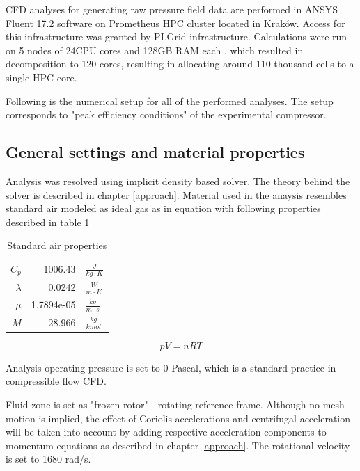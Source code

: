 CFD analyses for generating raw pressure field data are performed in ANSYS Fluent 17.2 software on Prometheus HPC cluster located in Kraków. Access for this infrastructure was granted by PLGrid infrastructure. Calculations were run on 5 nodes of 24CPU cores and 128GB RAM each \citep{prometheus}, which resulted in decomposition to 120 cores, resulting in allocating around 110 thousand cells to a single HPC core.

Following is the numerical setup for all of the performed analyses. The setup corresponds to "peak efficiency conditions" of the experimental compressor.

\subsection{General settings and material properties} \label{casegen}

Analysis was resolved using implicit density based solver. The theory behind the solver is described in chapter \ref{approach}. Material used in the anaysis resembles standard air modeled as ideal gas as in equation with following properties described in table \ref{tab:stdair} 

\begin{table}[htb!]
\centering
\caption{Standard air properties} \label{tab:stdair}
\begin{tabular}{ r r l }
$C_p$ & 1006.43 & $\frac{J}{kg \cdot K}$ \\
$\lambda$ & 0.0242 & $\frac{W}{m \cdot K}$ \\
$\mu$ & 1.7894e-05 & $\frac{kg}{m \cdot s}$ \\
$M$ & 28.966 & $\frac{kg}{kmol}$ \\
\end{tabular}
\end{table}

\begin{equation} \label{eq:stadair}
p V = n R T
\end{equation}

Analysis operating pressure is set to 0 Pascal, which is a standard practice in compressible flow CFD.

Fluid zone is set as "frozen rotor" - rotating reference frame. Although no mesh motion is implied, the effect of Coriolis accelerations and centrifugal acceleration will be taken into account by adding respective acceleration components to momentum equations as described in chapter \ref{approach}. The rotational velocity is set to 1680 rad/s.

